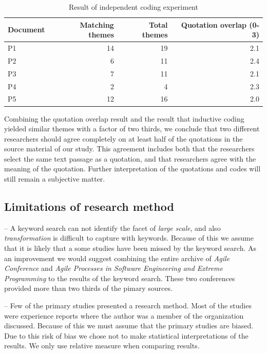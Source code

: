 \documentclass[preprint,authoryear,12pt]{elsarticle}
\begin{document}
\begin{table}
    \begin{tabular}{ l r r r }
        \toprule
        Document    &  Matching themes  &  Total themes  &  Quotation overlap (0-3) \\
        \midrule
        P1          &  14  &  19   &  2.1  \\
        P2          &   6  &  11   &  2.4  \\
        P3          &   7  &  11   &  2.1  \\
        P4          &   2  &   4   &  2.3  \\
        P5          &  12  &  16   &  2.0  \\
        \bottomrule
    \end{tabular}
    \caption{Result of independent coding experiment}
    \label{table:codingexperiment}
\end{table}

Combining the quotation overlap result and the result that inductive coding
yielded similar themes with a factor of two thirds, we conclude that two
different researchers should agree completely on at least half of the quotations
in the source material of our study. This agreement includes both that the
researchers select the same text passage as a quotation, and that researchers
agree with the meaning of the quotation. Further interpretation of the
quotations and codes will still remain a subjective matter.


\subsection{Limitations of research method}

-- A keyword search can not identify the facet of \emph{large scale}, and also
   \emph{transformation} is difficult to capture with keywords. Because of this
   we assume that it is likely that a some studies have been missed by the
   keyword search. As an improvement we would suggest combining the entire
   archive of \emph{Agile Conference} and \emph{Agile Processes in Software
   Engineering and Extreme Programming} to the results of the keyword search.
   These two conferences provided more than two thirds of the pimary sources.

-- Few of the primary studies presented a research method. Most of the studies
   were experience reports where the author was a member of the organization
   discussed. Because of this we must assume that the primary studies are
   biased. Due to this risk of bias we chose not to make statistical
   interpretations of the results. We only use relative measure when comparing
   results.
\end{document}
